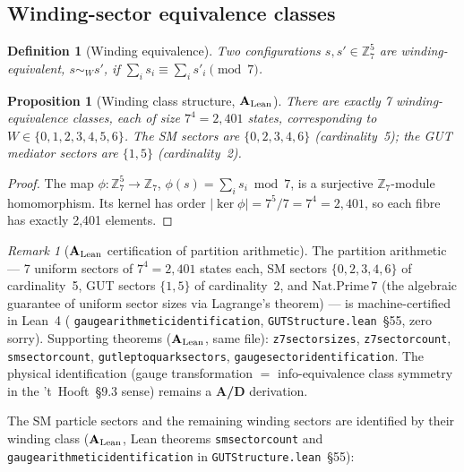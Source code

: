 \documentclass[11pt]{article}
\newtheorem{proposition}[theorem]{Proposition}
\newtheorem{definition}[theorem]{Definition}
\theoremstyle{remark}
\newtheorem{remark}[theorem]{Remark}
\newcommand{\lean}[1]{%
  \penalty-100
  \begingroup\def\_{\textunderscore\allowbreak}\texttt{#1}\endgroup}
\newcommand{\CatAL}{\ensuremath{\textbf{A}_{\rm Lean}}}
\newcommand{\CatAD}{\textbf{A/D}}
\begin{document}
\subsection{Winding-sector equivalence classes}
\label{ssec:winding}

\begin{definition}[Winding equivalence]
\label{def:winding}
Two configurations $s, s' \in \mathbb{Z}_7^5$ are winding-equivalent,
$s \sim_W s'$, if $\sum_i s_i \equiv \sum_i s'_i \pmod{7}$.
\end{definition}

\begin{proposition}[Winding class structure, \CatAL{}]
\label{prop:winding}
There are exactly 7 winding-equivalence classes, each of size
$7^4 = 2{,}401$ states, corresponding to $W \in \{0,1,2,3,4,5,6\}$.
The SM sectors are $\{0,2,3,4,6\}$ (cardinality~5); the GUT mediator
sectors are $\{1,5\}$ (cardinality~2).
\end{proposition}

\begin{proof}
The map $\phi: \mathbb{Z}_7^5 \to \mathbb{Z}_7$, $\phi(s) = \sum_i s_i \bmod 7$,
is a surjective $\mathbb{Z}_7$-module homomorphism.
Its kernel has order $|\ker\phi| = 7^5/7 = 7^4 = 2{,}401$,
so each fibre has exactly 2{,}401 elements.
\end{proof}

\begin{remark}[\CatAL{} certification of partition arithmetic]
\label{rem:gauge_arith_catAL}
The partition arithmetic --- 7 uniform sectors of $7^4 = 2{,}401$ states
each, SM sectors $\{0,2,3,4,6\}$ of cardinality~5, GUT sectors $\{1,5\}$
of cardinality~2, and $\mathrm{Nat.Prime}\,7$ (the algebraic guarantee
of uniform sector sizes via Lagrange's theorem) --- is machine-certified
in Lean~4 (\lean{gauge\_arithmetic\_identification},
\texttt{GUTStructure.lean}~\S55, zero sorry).
Supporting theorems (\CatAL{}, same file):
\lean{z7\_sector\_sizes}, \lean{z7\_sector\_count}, \lean{sm\_sector\_count},
\lean{gut\_leptoquark\_sectors}, \lean{gauge\_sector\_identification}.
The physical identification (gauge transformation $=$ info-equivalence
class symmetry in the 't~Hooft~\S9.3 sense) remains a \CatAD{} derivation.
\end{remark}

The SM particle sectors and the remaining winding sectors are identified
by their winding class (\CatAL{}, Lean theorems
\lean{sm\_sector\_count} and \lean{gauge\_arithmetic\_identification} in \texttt{GUTStructure.lean}~\S55):
\end{document}
